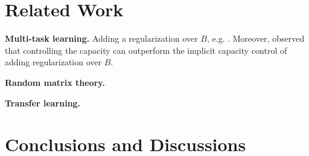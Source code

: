 \section{Related Work}

\textbf{Multi-task learning.}
 Adding a regularization over $B$, e.g. \cite{LPTV09,LPVT11}.
Moreover, \cite{KD12} observed that controlling the capacity can outperform the implicit capacity control of adding regularization over $B$.


\textbf{Random matrix theory.}

\textbf{Transfer learning.}

\section{Conclusions and Discussions}
